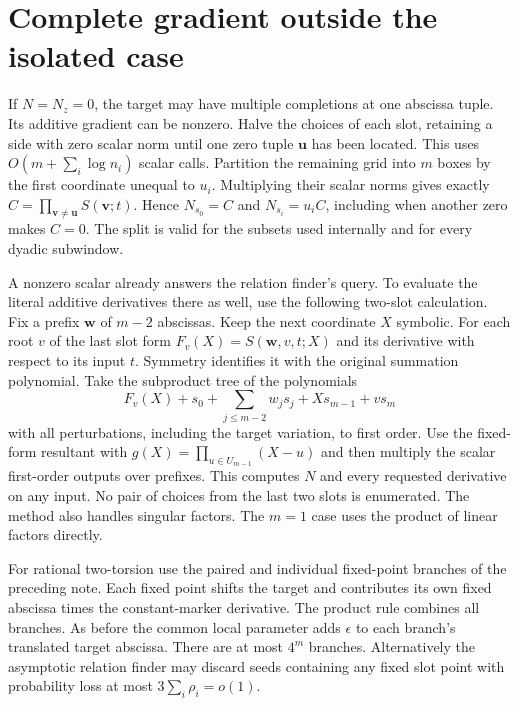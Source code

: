 \documentclass[11pt]{article}
\begin{document}
\section{Complete gradient outside the isolated case}
If $N=N_z=0$, the target may have multiple completions at one
abscissa tuple. Its additive gradient can be nonzero. Halve the
choices of each slot, retaining a side with zero scalar norm until
one zero tuple $\mathbf u$ has been located. This uses
$O(m+\sum_i\log n_i)$ scalar calls. Partition the remaining grid
into $m$ boxes by the first coordinate unequal to $u_i$. Multiplying
their scalar norms gives exactly $C=\prod_{\mathbf v\ne\mathbf u}
S(\mathbf v;t)$. Hence $N_{s_0}=C$ and $N_{s_i}=u_i C$, including
when another zero makes $C=0$. The split is valid for the subsets
used internally and for every dyadic subwindow.

A nonzero scalar already answers the relation finder's query. To
evaluate the literal additive derivatives there as well, use the
following two-slot calculation. Fix a prefix $\mathbf w$ of $m-2$
abscissas. Keep the next coordinate $X$ symbolic. For each root
$v$ of the last slot form $F_v(X)=S(\mathbf w,v,t;X)$ and its
derivative with respect to its input $t$. Symmetry identifies it
with the original summation polynomial. Take the subproduct tree of
the polynomials
\[
   F_v(X)+s_0+\sum_{j\le m-2}w_j s_j + Xs_{m-1}+vs_m
\]
with all perturbations, including the target variation, to first
order. Use the fixed-form resultant with
$g(X)=\prod_{u\in U_{m-1}}(X-u)$ and then multiply the scalar
first-order outputs over prefixes. This computes $N$ and every
requested derivative on any input. No pair of choices from the last
two slots is enumerated. The method also handles singular factors.
The $m=1$ case uses the product of linear factors directly.

For rational two-torsion use the paired and individual fixed-point
branches of the preceding note. Each fixed point shifts the target
and contributes its own fixed abscissa times the constant-marker
derivative. The product rule combines all branches. As before the
common local parameter adds $\epsilon$ to each branch's translated
target abscissa. There are at most $4^m$ branches. Alternatively
the asymptotic relation finder may discard seeds containing any
fixed slot point with probability loss at most $3\sum_i\rho_i=o(1)$.
\end{document}
